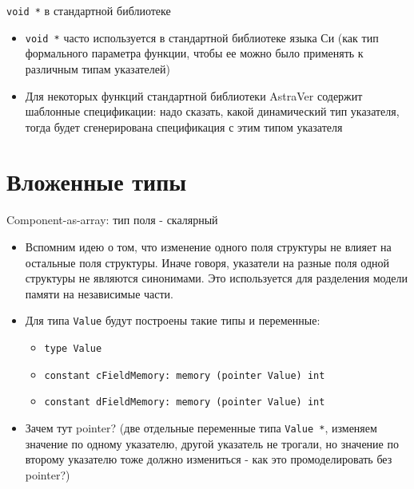 \documentclass[hyperref={unicode=true}]{beamer}
\begin{document}
    \begin{frame}{\texttt{void *} в стандартной библиотеке}
    \begin{itemize}
    \item
    \texttt{void *} часто используется в стандартной библиотеке
    языка Си (как тип формального параметра функции, чтобы
    ее можно было применять к различным типам указателей)
    \item
    Для некоторых функций стандартной библиотеки
    AstraVer содержит шаблонные спецификации: надо сказать,
    какой динамический тип указателя, тогда будет сгенерирована
    спецификация с этим типом указателя
    \end{itemize}
    \end{frame}

    \section{Вложенные типы}

    \begin{frame}{Component-as-array: тип поля - скалярный}
    \begin{itemize}
    \item
    Вспомним идею о том, что изменение одного поля структуры
    не влияет на остальные поля структуры. Иначе говоря,
    указатели на разные поля одной структуры не являются синонимами.
    Это используется для разделения модели памяти на независимые
    части.
    \item
    Для типа \texttt{Value} будут построены такие типы и переменные:
        \begin{itemize}
        \item \texttt{type Value}
        \item \texttt{constant cFieldMemory: memory (pointer Value) int}
        \item \texttt{constant dFieldMemory: memory (pointer Value) int}
        \end{itemize}
    \item
    Зачем тут pointer? (две отдельные переменные типа \texttt{Value *},
    изменяем значение по одному указателю, другой указатель не трогали,
    но значение по второму указателю тоже должно измениться - как это
    промоделировать без pointer?)
    \end{itemize}
    \end{frame}
\end{document}
